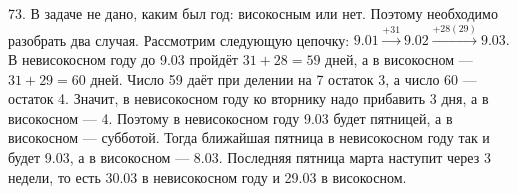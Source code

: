 73. В задаче не дано, каким был год: високосным или нет. Поэтому необходимо разобрать два случая. Рассмотрим следующую цепочку:
$9.01\stackrel{+31}{\rightarrow}9.02\stackrel{+28(29)}{\rightarrow}9.03.$ В невисокосном году до 9.03 пройдёт $31+28=59$ дней, а в високосном --- $31+29=60$ дней. Число 59 даёт при делении на 7 остаток 3, а число 60 --- остаток 4. Значит, в невисокосном году ко вторнику надо прибавить 3 дня, а в високосном --- 4. Поэтому в невисокосном году 9.03 будет пятницей, а в високосном --- субботой. Тогда ближайшая пятница в невисокосном году так и будет 9.03, а в високосном --- 8.03. Последняя пятница марта наступит через 3 недели, то есть 30.03 в невисокосном году и 29.03 в високосном.\\

